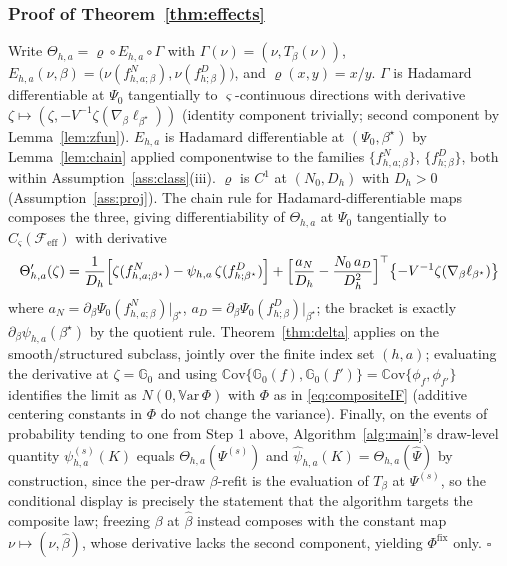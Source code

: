 \documentclass[11pt]{article}
\newcommand{\G}{\mathbb G}
\newcommand{\Var}{\mathbb V\mathrm{ar}}
\newcommand{\Cov}{\mathbb C\mathrm{ov}}
\newcommand{\calF}{\mathcal F}
\newcommand{\hPsi}{\widehat\Psi}
\begin{document}
\subsubsection{Proof of Theorem~\ref{thm:effects}}
Write $\Theta_{h,a}=\varrho\circ E_{h,a}\circ\Gamma$ with $\Gamma(\nu)=(\nu,T_\beta(\nu))$, $E_{h,a}(\nu,\beta)=\bigl(\nu(f^N_{h,a;\beta}),\nu(f^D_{h;\beta})\bigr)$, and $\varrho(x,y)=x/y$. $\Gamma$ is Hadamard differentiable at $\Psi_0$ tangentially to $\varsigma$-continuous directions with derivative $\zeta\mapsto(\zeta,-V^{-1}\zeta(\nabla_\beta\ell_{\beta^\star}))$ (identity component trivially; second component by Lemma~\ref{lem:zfun}). $E_{h,a}$ is Hadamard differentiable at $(\Psi_0,\beta^\star)$ by Lemma~\ref{lem:chain} applied componentwise to the families $\{f^N_{h,a;\beta}\}$, $\{f^D_{h;\beta}\}$, both within Assumption~\ref{ass:class}(iii). $\varrho$ is $C^1$ at $(N_0,D_h)$ with $D_h>0$ (Assumption~\ref{ass:proj}). The chain rule for Hadamard-differentiable maps \citep[Lemma~3.9.3]{vdvwellner1996} composes the three, giving differentiability of $\Theta_{h,a}$ at $\Psi_0$ tangentially to $C_\varsigma(\calF_{\mathrm{eff}})$ with derivative
\begin{equation*}
\Theta_{h,a}'(\zeta)
=\frac1{D_h}\Bigl[\zeta(f^N_{h,a;\beta^\star})-\psi_{h,a}\,\zeta(f^D_{h;\beta^\star})\Bigr]
+\Bigl[\frac{a_N}{D_h}-\frac{N_0\,a_D}{D_h^2}\Bigr]^\top\bigl\{-V^{-1}\zeta(\nabla_\beta\ell_{\beta^\star})\bigr\}
\end{equation*}
where $a_N=\partial_\beta\Psi_0(f^N_{h,a;\beta})|_{\beta^\star}$, $a_D=\partial_\beta\Psi_0(f^D_{h;\beta})|_{\beta^\star}$; the bracket is exactly $\partial_\beta\psi_{h,a}(\beta^\star)$ by the quotient rule. Theorem~\ref{thm:delta} applies on the smooth/structured subclass, jointly over the finite index set $(h,a)$; evaluating the derivative at $\zeta=\G_0$ and using $\Cov\{\G_0(f),\G_0(f')\}=\Cov\{\phi_f,\phi_{f'}\}$ identifies the limit as $N(0,\Var\,\Phi)$ with $\Phi$ as in \eqref{eq:compositeIF} (additive centering constants in $\Phi$ do not change the variance). Finally, on the events of probability tending to one from Step 1 above, Algorithm~\ref{alg:main}'s draw-level quantity $\psi^{(s)}_{h,a}(K)$ equals $\Theta_{h,a}(\Psi^{(s)})$ and $\hat\psi_{h,a}(K)=\Theta_{h,a}(\hPsi)$ by construction, since the per-draw $\beta$-refit is the evaluation of $T_\beta$ at $\Psi^{(s)}$, so the conditional display is precisely the statement that the algorithm targets the composite law; freezing $\beta$ at $\hat\beta$ instead composes with the constant map $\nu\mapsto(\nu,\hat\beta)$, whose derivative lacks the second component, yielding $\Phi^{\mathrm{fix}}$ only. \hfill$\square$
\end{document}
